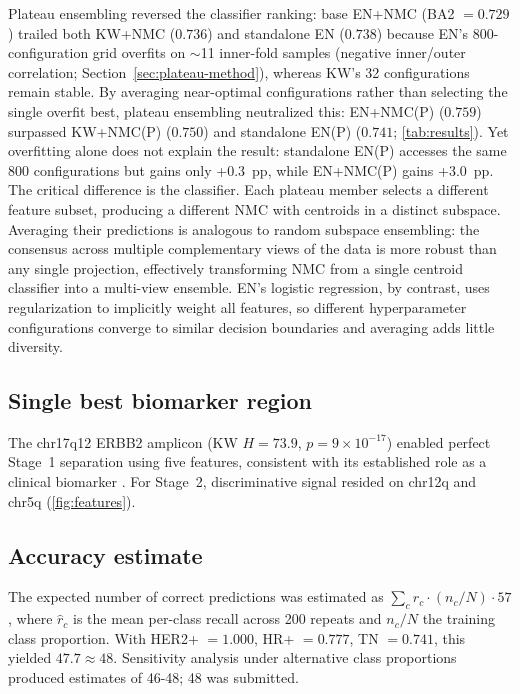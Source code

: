 \documentclass[11pt,a4paper,twocolumn]{article}
\begin{document}
Plateau ensembling reversed the classifier ranking: base EN+NMC (BA2 $= 0.729$) trailed both KW+NMC ($0.736$) and standalone EN ($0.738$) because EN's 800-configuration grid overfits on $\sim$11 inner-fold samples (negative inner/outer correlation; Section~\ref{sec:plateau-method}), whereas KW's 32 configurations remain stable. By averaging near-optimal configurations rather than selecting the single overfit best, plateau ensembling neutralized this: EN+NMC(P) ($0.759$) surpassed KW+NMC(P) ($0.750$) and standalone EN(P) ($0.741$; \autoref{tab:results}). Yet overfitting alone does not explain the result: standalone EN(P) accesses the same 800 configurations but gains only +0.3~pp, while EN+NMC(P) gains +3.0~pp. The critical difference is the classifier. Each plateau member selects a different feature subset, producing a different NMC with centroids in a distinct subspace. Averaging their predictions is analogous to random subspace ensembling: the consensus across multiple complementary views of the data is more robust than any single projection, effectively transforming NMC from a single centroid classifier into a multi-view ensemble. EN's logistic regression, by contrast, uses regularization to implicitly weight all features, so different hyperparameter configurations converge to similar decision boundaries and averaging adds little diversity.

\subsection{Single best biomarker region}
\label{sec:biomarker}

The chr17q12 ERBB2 amplicon (KW $H = 73.9$, $p = 9 \times 10^{-17}$) enabled perfect Stage~1 separation using five features, consistent with its established role as a clinical biomarker \citep{slamon1987her2}. For Stage~2, discriminative signal resided on chr12q and chr5q (\autoref{fig:features}).

\subsection{Accuracy estimate}
\label{sec:estimate}

The expected number of correct predictions was estimated as $\sum_c \hat{r}_c \cdot (n_c/N) \cdot 57$, where $\hat{r}_c$ is the mean per-class recall across 200 repeats and $n_c/N$ the training class proportion. With HER2+ $= 1.000$, HR+ $= 0.777$, TN $= 0.741$, this yielded $47.7 \approx 48$. Sensitivity analysis under alternative class proportions produced estimates of 46-48; 48 was submitted.
\end{document}
